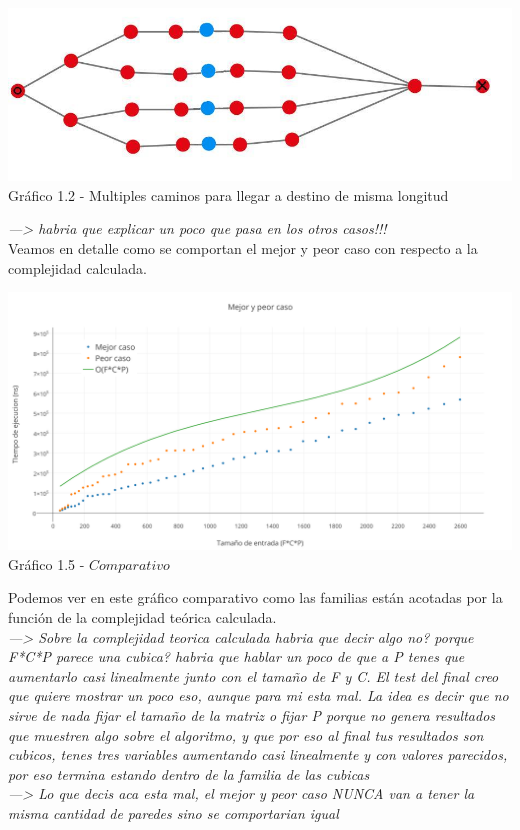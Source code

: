 \vspace*{0.3cm} \vspace*{0.3cm}
  \begin{center}
\includegraphics[scale=0.7]{./EJ1/ej1grafopeorcaso.jpeg}
{Gr\'afico 1.2 - Multiples caminos para llegar a destino de misma longitud}
  \end{center}
  \vspace*{0.3cm}

\textit{---> habria que explicar un poco que pasa en los otros casos!!!}\\

Veamos en detalle como se comportan el mejor y peor caso con respecto a la complejidad calculada.\\

  \vspace*{0.3cm} \vspace*{0.3cm}
  \begin{center}
\includegraphics[scale=0.5]{./EJ1/MejorYPeorCaso.png}
{Gr\'afico 1.5 - $Comparativo$}
  \end{center}
  \vspace*{0.3cm}
  
Podemos ver en este gr\'afico comparativo como las familias est\'an acotadas por la funci\'on de la complejidad te\'orica calculada.\\

\textit{---> Sobre la complejidad teorica calculada habria que decir algo no? porque F*C*P parece una cubica? habria que hablar un poco de que a P tenes que aumentarlo casi linealmente junto con el tamaño de F y C. El test del final creo que quiere mostrar un poco eso, aunque para mi esta mal. La idea es decir que no sirve de nada fijar el tamaño de la matriz o fijar P porque no genera resultados que muestren algo sobre el algoritmo, y que por eso al final tus resultados son cubicos, tenes tres variables aumentando casi linealmente y con valores parecidos, por eso termina estando dentro de la familia de las cubicas}\\
\textit{---> Lo que decis aca esta mal, el mejor y peor caso NUNCA van a tener la misma cantidad de paredes sino se comportarian igual}

